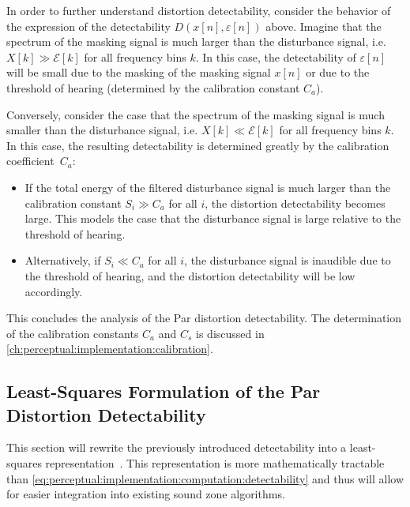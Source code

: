 In order to further understand distortion detectability, consider the behavior of the expression of the 
detectability $D(x[n],\varepsilon[n])$ above.
Imagine that the spectrum of the masking signal is much larger than the disturbance signal, 
i.e. $X[k] \gg \mathcal{E}[k]$ for all frequency bins $k$.
In this case, the detectability of $\varepsilon[n]$ will be small due to the masking of the masking signal $x[n]$ or
due to the threshold of hearing (determined by the calibration constant $C_a$).

Conversely, consider the case that the spectrum of the masking signal is much smaller than the disturbance signal,
i.e. $X[k] \ll \mathcal{E}[k]$ for all frequency bins $k$.
In this case, the resulting detectability is determined greatly by the calibration coefficient~$C_a$: 
\begin{itemize}
    \item If the total energy of the filtered disturbance signal is much larger than the calibration constant 
        $S_i \gg C_a$ for all $i$, the distortion detectability becomes large.
        This models the case that the disturbance signal is large relative to the threshold of hearing.
    \item Alternatively, if $S_i \ll C_a$ for all $i$, the disturbance signal is inaudible due to the threshold of hearing, and the distortion detectability will be low accordingly.
\end{itemize}

This concludes the analysis of the Par distortion detectability.
The determination of the calibration constants $C_a$ and $C_s$ is discussed in \autoref{ch:perceptual:implementation:calibration}.


\subsection{Least-Squares Formulation of the Par Distortion Detectability}
\label{ch:perceptual:implementation:least_squares}
This section will rewrite the previously introduced detectability into a least-squares representation~\cite{taal2012low}. 
This representation is more mathematically tractable than 
\autoref{eq:perceptual:implementation:computation:detectability} and thus 
will allow for easier integration into existing sound zone algorithms.

